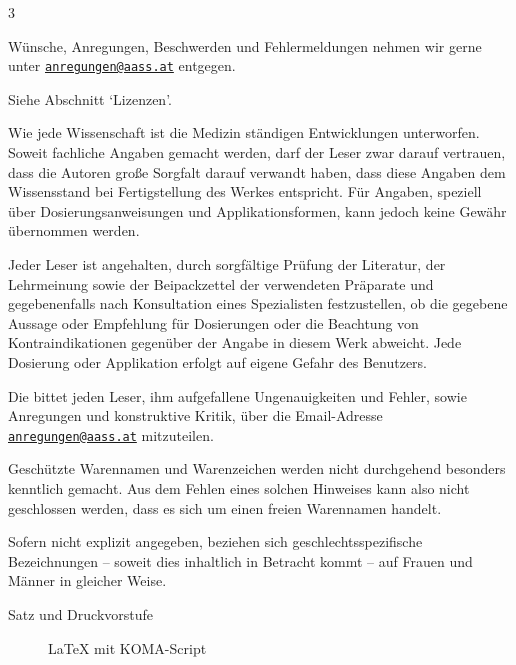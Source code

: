 \begin{WidePar}
\begin{multicols}{3}

\noindent{}Wünsche, Anregungen, Beschwerden und Fehlermeldungen nehmen wir
gerne unter 
\href{mailto:anregungen@aass.at}{\nolinkurl{anregungen@aass.at}} entgegen.


\noindent{} Siehe Abschnitt \enquote*{Lizenzen}.
% 


\noindent{}Wie jede Wissenschaft ist die Medizin ständigen Entwicklungen
unterworfen. Soweit fachliche Angaben gemacht werden, darf der Leser
zwar darauf vertrauen, dass die Autoren große Sorgfalt
darauf verwandt haben, dass diese Angaben dem Wissensstand bei
Fertigstellung des Werkes entspricht. Für Angaben, speziell
über Dosierungsanweisungen und Applikationsformen, kann jedoch
keine Gewähr übernommen werden. 

Jeder Leser ist angehalten, durch
sorgfältige Prüfung der Literatur, der Lehrmeinung so\-wie der
Beipackzettel der verwendeten Präparate und gegebenenfalls nach
Konsultation eines Spezialisten festzustellen, ob die gegebene
Aussage oder Empfehlung für Dosierungen oder die Beachtung von
Kontraindikationen gegenüber der Angabe in diesem
Werk abweicht. Jede Dosierung oder Applikation erfolgt
auf eigene Gefahr des Benutzers. 

Die {\ARGEAASS} bittet jeden Leser, ihm aufgefallene Ungenauigkeiten und
Fehler, sowie Anregungen und konstruktive Kritik, über die Email-Adresse
\href{mailto:anregungen@aass.at}{\nolinkurl{anregungen@aass.at}} mitzuteilen.

Geschützte Warennamen und Warenzeichen werden nicht durchgehend besonders
kenntlich gemacht. Aus dem Fehlen eines solchen Hinweises kann also
nicht geschlossen werden, dass es sich um einen freien Warennamen
handelt.

Sofern nicht explizit angegeben, beziehen sich 
geschlechtsspezifische Bezeichnungen -- soweit dies
inhaltlich in Betracht kommt -- auf Frauen und Männer in
gleicher Weise.


\begin{description}
  \item[Satz und Druckvorstufe] \LaTeX{} mit {\sffamily KOMA-Script}
  

\end{description}
\end{multicols}
\end{WidePar}
